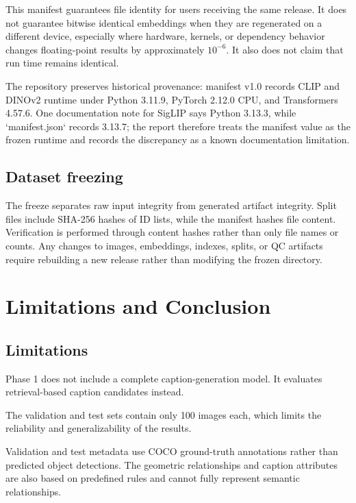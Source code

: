 \documentclass{article}
\begin{document}
This manifest guarantees file identity for users receiving the same
release. It does not guarantee bitwise identical embeddings when they
are regenerated on a different device, especially where hardware,
kernels, or dependency behavior changes floating-point results by
approximately \(10^{-6}\). It also does not claim that
run time remains identical.

The repository preserves historical provenance: manifest v1.0 records
CLIP and DINOv2 runtime under Python 3.11.9, PyTorch 2.12.0 CPU, and
Transformers 4.57.6. One documentation note for SigLIP says Python
3.13.3, while `manifest.json` records 3.13.7; the report therefore
treats the manifest value as the frozen runtime and records the
discrepancy as a known documentation limitation.

\subsection{Dataset freezing}\label{dataset-freezing}

The freeze separates raw input integrity from generated artifact
integrity. Split files include SHA-256 hashes of ID lists, while the
manifest hashes file content. Verification is performed through content
hashes rather than only file names or counts. Any changes to images,
embeddings, indexes, splits, or QC artifacts require rebuilding a new
release rather than modifying the frozen directory.

\section{Limitations and
Conclusion}\label{limitations-and-conclusion}

\subsection{Limitations}\label{limitations}

Phase 1 does not include a complete caption-generation model.
It evaluates retrieval-based caption candidates instead.

The validation and test sets contain only 100 images each, which
limits the reliability and generalizability of the results.

Validation and test metadata use COCO ground-truth annotations
rather than predicted object detections. The geometric relationships
and caption attributes are also based on predefined rules and
cannot fully represent semantic relationships.
\end{document}
